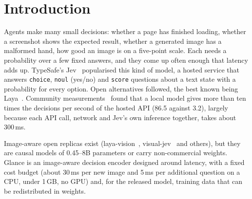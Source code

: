 \documentclass[10pt]{article}
\begin{document}
\section{Introduction}
Agents make many small decisions: whether a page has finished loading, whether a screenshot shows the expected result, whether a generated image has a malformed hand, how good an image is on a five-point scale. Each needs a probability over a few fixed answers, and they come up often enough that latency adds up. TypeSafe's Jev~\cite{jev2026,jevdocs} popularised this kind of model, a hosted service that answers \texttt{choice}, \texttt{noul} (yes/no) and \texttt{score} questions about a text state with a probability for every option. Open alternatives followed, the best known being Laya~\cite{laya2026}. Community measurements~\cite{sina2026} found that a local model gives more than ten times the decisions per second of the hosted API (86.5 against 3.2), largely because each API call, network and Jev's own inference together, takes about 300\,ms.

Image-aware open replicas exist (laya-vision~\cite{layavision2026}, visual-jev~\cite{visualjev2026} and others), but they are causal models of 0.45--8B parameters or carry non-commercial weights. Glance is an image-aware decision encoder designed around latency, with a fixed cost budget (about 30\,ms per new image and 5\,ms per additional question on a CPU, under 1\,GB, no GPU) and, for the released model, training data that can be redistributed in weights.
\end{document}
